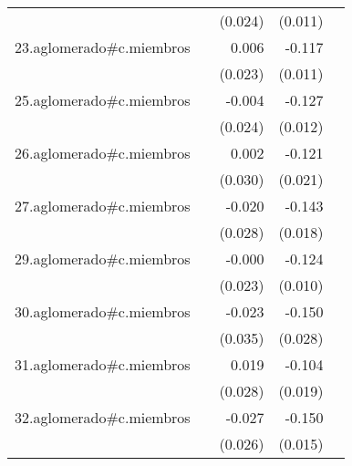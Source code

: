 {\begin{longtable}{l*{4}{D{.}{.}{-1}}}
            &                     &     (0.024)         &     (0.011)         &                     \\
\addlinespace
23.aglomerado#c.miembros&                     &       0.006         &      -0.117\sym{***}&                     \\
            &                     &     (0.023)         &     (0.011)         &                     \\
\addlinespace
25.aglomerado#c.miembros&                     &      -0.004         &      -0.127\sym{***}&                     \\
            &                     &     (0.024)         &     (0.012)         &                     \\
\addlinespace
26.aglomerado#c.miembros&                     &       0.002         &      -0.121\sym{***}&                     \\
            &                     &     (0.030)         &     (0.021)         &                     \\
\addlinespace
27.aglomerado#c.miembros&                     &      -0.020         &      -0.143\sym{***}&                     \\
            &                     &     (0.028)         &     (0.018)         &                     \\
\addlinespace
29.aglomerado#c.miembros&                     &      -0.000         &      -0.124\sym{***}&                     \\
            &                     &     (0.023)         &     (0.010)         &                     \\
\addlinespace
30.aglomerado#c.miembros&                     &      -0.023         &      -0.150\sym{***}&                     \\
            &                     &     (0.035)         &     (0.028)         &                     \\
\addlinespace
31.aglomerado#c.miembros&                     &       0.019         &      -0.104\sym{***}&                     \\
            &                     &     (0.028)         &     (0.019)         &                     \\
\addlinespace
32.aglomerado#c.miembros&                     &      -0.027         &      -0.150\sym{***}&                     \\
            &                     &     (0.026)         &     (0.015)         &                     \\

\end{longtable}}
